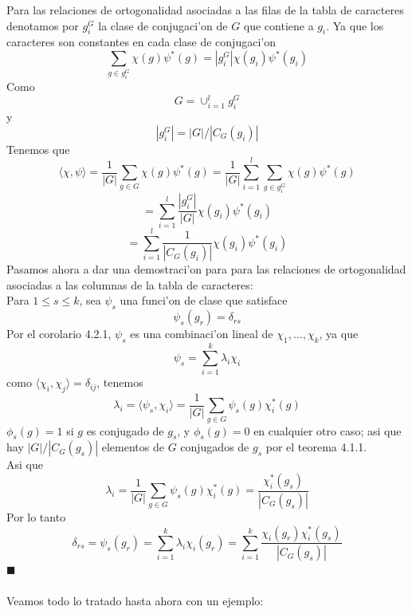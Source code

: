 \documentclass[a4paper,openright,12pt]{book}
\numberwithin{equation}{section} %
\newenvironment{proof}{\noindent{\it Demostracion:}}{\hfill$\blacksquare$} %
\begin{document}
\begin{proof}
Para las relaciones de ortogonalidad asociadas a las filas de la tabla de caracteres denotamos por $g_{i}^{G}$ la clase de conjugaci'on de $G$ que contiene a $g_{i}$. Ya que los caracteres son constantes en cada clase de conjugaci'on
\[
\sum_{g \in g_{i}^{G}}\chi(g)\psi^{*}(g)=|g_{i}^{G}|\chi(g_{i})\psi^{*}(g_{i})
\]
Como
\[
G=\cup_{i=1}^{l} g_{i}^{G}
\]
y
\[
|g_{i}^{G}|=|G|/|C_{G}(g_{i})|
\]
Tenemos que
\[
\langle \chi, \psi \rangle = \frac{1}{|G|} \sum_{g \in G}\chi(g)\psi^{*}(g)=\frac{1}{|G|} \sum_{i=1}^{l} \sum_{g \in g_{i}^{G}} \chi(g)\psi^{*}(g)
\]
\[
=\sum_{i=1}^{l}\frac{|g_{i}^{G}|}{|G|}\chi (g_{i})\psi^{*}(g_{i})
\]
\[
=\sum_{i=1}^{l}\frac{1}{|C_{G}(g_{i})|}\chi(g_{i})\psi^{*}(g_{i})
\]
Pasamos ahora a dar una demostraci'on para para las relaciones de ortogonalidad asociadas a las columnas de la tabla de caracteres:\\
Para $1 \leq s \leq k$, sea $\psi_{s}$ una funci'on de clase que satisface 
\[
\psi_{s}(g_{r})=\delta_{rs}
\]
Por el corolario 4.2.1, $\psi_{s}$ es una combinaci'on lineal de $\chi_{1}, \ldots ,\chi_{k}$, ya que
\[
\psi_{s}=\sum_{i=1}^{k}\lambda_{i}\chi_{i}
\]
como $\langle \chi_{i} ,\chi_{j} \rangle = \delta_{ij}$, tenemos
\[
\lambda_{i}=\langle \psi_{s}, \chi_{i} \rangle = \frac{1}{|G|}\sum_{g \in G}\psi_{s}(g)\chi_{i}^{*}(g)
\]
$\phi_{s}(g)=1$ si $g$ es conjugado de $g_{s}$, y $\phi_{s}(g)=0$ en cualquier otro caso; asi que hay $|G|/|C_{G}(g_{s})|$ elementos de $G$ conjugados de $g_{s}$ por el teorema 4.1.1.\\
Asi que
\[
\lambda_{i}=\frac{1}{|G|}\sum_{g \in G}\psi_{s}(g)\chi_{i}^{*}(g)=\frac{\chi_{i}^{*}(g_{s})}{|C_{G}(g_{s})|}
\]
Por lo tanto
\[
\delta_{rs}=\psi_{s}(g_{r})=\sum_{i=1}^{k}\lambda_{i}\chi_{i}(g_{r})=\sum_{i=1}^{k}\frac{\chi_{i}(g_{r})\chi_{i}^{*}(g_{s})}{|C_{G}(g_{s})|}
\]
\end{proof}\\
\\
Veamos todo lo tratado hasta ahora con un ejemplo:
\end{document}
